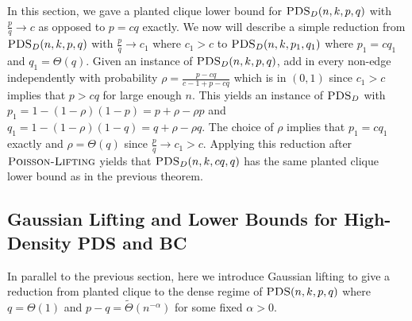 In this section, we gave a planted clique lower bound for $\textsc{PDS}_D(n, k, p, q)$ with $\frac{p}{q} \to c$ as opposed to $p = cq$ exactly. We now will describe a simple reduction from $\textsc{PDS}_D(n, k, p, q)$ with $\frac{p}{q} \to c_1$ where $c_1 > c$ to $\textsc{PDS}_D(n, k, p_1, q_1)$ where $p_1 = cq_1$ and $q_1 = \Theta(q)$. Given an instance of $\textsc{PDS}_D(n, k, p, q)$, add in every non-edge independently with probability $\rho = \frac{p - cq}{c - 1 + p - cq}$ which is in $(0, 1)$ since $c_1 > c$ implies that $p > cq$ for large enough $n$. This yields an instance of $\textsc{PDS}_D$ with $p_1 = 1 - (1 - \rho)(1 - p) = p + \rho - \rho p$ and $q_1 = 1 - (1 - \rho)(1 - q) = q + \rho - \rho q$. The choice of $\rho$ implies that $p_1 = cq_1$ exactly and $\rho = \Theta(q)$ since $\frac{p}{q} \to c_1 > c$. Applying this reduction after $\textsc{Poisson-Lifting}$ yields that $\textsc{PDS}_D(n, k, cq, q)$ has the same planted clique lower bound as in the previous theorem.

\subsection{Gaussian Lifting and Lower Bounds for High-Density PDS and BC}

In parallel to the previous section, here we introduce Gaussian lifting to give a reduction from planted clique to the dense regime of $\textsc{PDS}(n, k, p, q)$ where $q = \Theta(1)$ and $p - q = \tilde{\Theta}(n^{-\alpha})$ for some fixed $\alpha > 0$.

